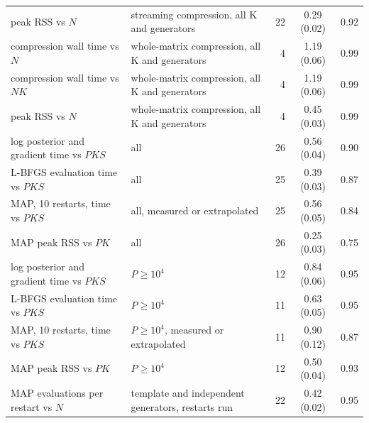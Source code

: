 \begin{table}[htbp]
\begin{tabular}{@{}p{5.2cm}p{4.2cm}rcr@{}}
\parbox[t]{5.2cm}{\raggedright peak RSS vs $N$\strut} & \parbox[t]{4.2cm}{\raggedright\footnotesize streaming compression, all K and generators\strut} & 22 & 0.29 (0.02) & 0.92 \\
\parbox[t]{5.2cm}{\raggedright compression wall time vs $N$\strut} & \parbox[t]{4.2cm}{\raggedright\footnotesize whole-matrix compression, all K and generators\strut} & 4 & 1.19 (0.06) & 0.99 \\
\parbox[t]{5.2cm}{\raggedright compression wall time vs $NK$\strut} & \parbox[t]{4.2cm}{\raggedright\footnotesize whole-matrix compression, all K and generators\strut} & 4 & 1.19 (0.06) & 0.99 \\
\parbox[t]{5.2cm}{\raggedright peak RSS vs $N$\strut} & \parbox[t]{4.2cm}{\raggedright\footnotesize whole-matrix compression, all K and generators\strut} & 4 & 0.45 (0.03) & 0.99 \\
\parbox[t]{5.2cm}{\raggedright log posterior and gradient time vs $PKS$\strut} & \parbox[t]{4.2cm}{\raggedright\footnotesize all\strut} & 26 & 0.56 (0.04) & 0.90 \\
\parbox[t]{5.2cm}{\raggedright L-BFGS evaluation time vs $PKS$\strut} & \parbox[t]{4.2cm}{\raggedright\footnotesize all\strut} & 25 & 0.39 (0.03) & 0.87 \\
\parbox[t]{5.2cm}{\raggedright MAP, 10 restarts, time vs $PKS$\strut} & \parbox[t]{4.2cm}{\raggedright\footnotesize all, measured or extrapolated\strut} & 25 & 0.56 (0.05) & 0.84 \\
\parbox[t]{5.2cm}{\raggedright MAP peak RSS vs $PK$\strut} & \parbox[t]{4.2cm}{\raggedright\footnotesize all\strut} & 26 & 0.25 (0.03) & 0.75 \\
\parbox[t]{5.2cm}{\raggedright log posterior and gradient time vs $PKS$\strut} & \parbox[t]{4.2cm}{\raggedright\footnotesize $P\geq 10^{4}$\strut} & 12 & 0.84 (0.06) & 0.95 \\
\parbox[t]{5.2cm}{\raggedright L-BFGS evaluation time vs $PKS$\strut} & \parbox[t]{4.2cm}{\raggedright\footnotesize $P\geq 10^{4}$\strut} & 11 & 0.63 (0.05) & 0.95 \\
\parbox[t]{5.2cm}{\raggedright MAP, 10 restarts, time vs $PKS$\strut} & \parbox[t]{4.2cm}{\raggedright\footnotesize $P\geq 10^{4}$, measured or extrapolated\strut} & 11 & 0.90 (0.12) & 0.87 \\
\parbox[t]{5.2cm}{\raggedright MAP peak RSS vs $PK$\strut} & \parbox[t]{4.2cm}{\raggedright\footnotesize $P\geq 10^{4}$\strut} & 12 & 0.50 (0.04) & 0.93 \\
\parbox[t]{5.2cm}{\raggedright MAP evaluations per restart vs $N$\strut} & \parbox[t]{4.2cm}{\raggedright\footnotesize template and independent generators, restarts run\strut} & 22 & 0.42 (0.02) & 0.95 \\

\end{tabular}
\end{table}
